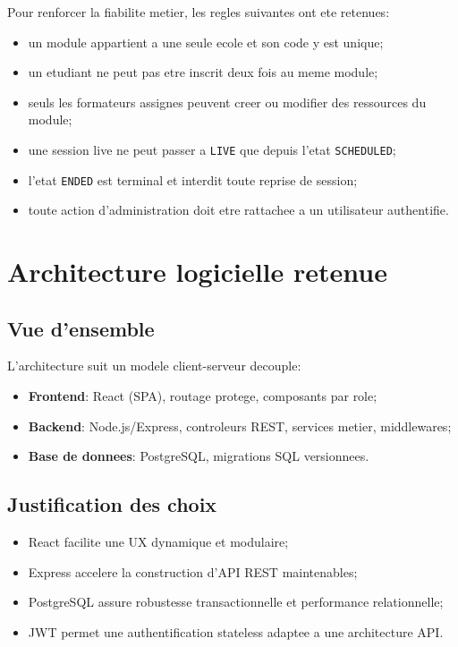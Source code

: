 ﻿\documentclass[12pt,a4paper,oneside]{report}
\begin{document}
Pour renforcer la fiabilite metier, les regles suivantes ont ete retenues:
\begin{itemize}
  \item un module appartient a une seule ecole et son code y est unique;
  \item un etudiant ne peut pas etre inscrit deux fois au meme module;
  \item seuls les formateurs assignes peuvent creer ou modifier des ressources du module;
  \item une session live ne peut passer a \texttt{LIVE} que depuis l'etat \texttt{SCHEDULED};
  \item l'etat \texttt{ENDED} est terminal et interdit toute reprise de session;
  \item toute action d'administration doit etre rattachee a un utilisateur authentifie.
\end{itemize}

\section{Architecture logicielle retenue}

\subsection{Vue d'ensemble}

L'architecture suit un modele client-serveur decouple:
\begin{itemize}
  \item \textbf{Frontend}: React (SPA), routage protege, composants par role;
  \item \textbf{Backend}: Node.js/Express, controleurs REST, services metier, middlewares;
  \item \textbf{Base de donnees}: PostgreSQL, migrations SQL versionnees.
\end{itemize}

\subsection{Justification des choix}

\begin{itemize}
  \item React facilite une UX dynamique et modulaire;
  \item Express accelere la construction d'API REST maintenables;
  \item PostgreSQL assure robustesse transactionnelle et performance relationnelle;
  \item JWT permet une authentification stateless adaptee a une architecture API.
\end{itemize}
\end{document}
